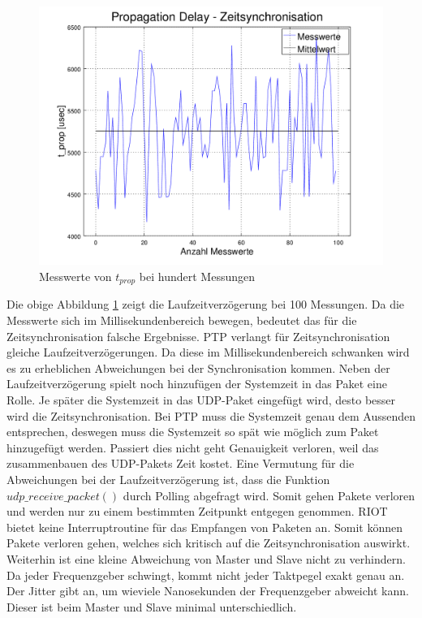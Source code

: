 \begin{figure}[H]
        \centering
        \hspace*{-1.7cm}
        \includegraphics[width=1.2\textwidth]{images/t_prop_zeit_sync_figure.png}
        \caption{Messwerte von $t_{prop}$ bei hundert Messungen}
        \label{img:zeit_sync_t_prop_figure}
\end{figure}

Die obige Abbildung \ref{img:zeit_sync_t_prop_figure} zeigt die Laufzeitverzögerung bei \si{100} Messungen. Da die Messwerte sich im Millisekundenbereich bewegen, bedeutet das für die Zeitsynchronisation falsche Ergebnisse. PTP verlangt für Zeitsynchronisation gleiche Laufzeitverzögerungen. Da diese im Millisekundenbereich schwanken wird es zu erheblichen Abweichungen bei der Synchronisation kommen. Neben der Laufzeitverzögerung spielt noch hinzufügen der Systemzeit in das Paket eine Rolle. Je später die Systemzeit in das UDP-Paket eingefügt wird, desto besser wird die Zeitsynchronisation. Bei PTP muss die Systemzeit genau dem Aussenden entsprechen, deswegen muss die Systemzeit so spät wie möglich zum Paket hinzugefügt werden. Passiert dies nicht geht Genauigkeit verloren, weil das zusammenbauen des UDP-Pakets Zeit kostet. Eine Vermutung für die Abweichungen bei der Laufzeitverzögerung ist, dass die Funktion $udp\_receive\_packet()$ durch Polling abgefragt wird. Somit gehen Pakete verloren und werden nur zu einem bestimmten Zeitpunkt entgegen genommen. RIOT bietet keine Interruptroutine für das Empfangen von Paketen an. Somit können Pakete verloren gehen, welches sich kritisch auf die Zeitsynchronisation auswirkt. Weiterhin ist eine kleine Abweichung von Master und Slave nicht zu verhindern. Da jeder Frequenzgeber schwingt, kommt nicht jeder Taktpegel exakt genau an. Der Jitter gibt an, um wieviele Nanosekunden der Frequenzgeber abweicht kann. Dieser ist beim Master und Slave minimal unterschiedlich.

